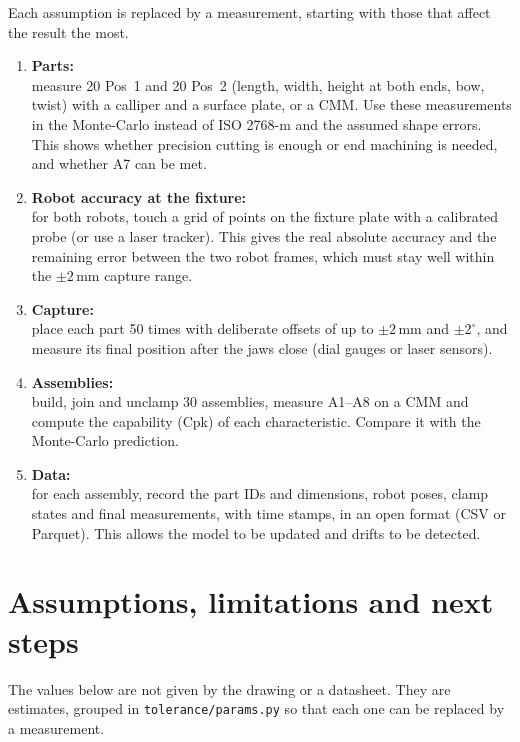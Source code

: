 \documentclass[11pt,a4paper]{article}
\newcommand{\code}[1]{\texttt{#1}}
\begin{document}
Each assumption is replaced by a measurement, starting with those that affect the result the most.
\begin{enumerate}
  \item \textbf{Parts:}\\ measure 20 Pos~1 and 20 Pos~2 (length, width, height at both ends, bow,
        twist) with a calliper and a surface plate, or a CMM. Use these measurements in the
        Monte-Carlo instead of ISO 2768-m and the assumed shape errors. This shows whether precision
        cutting is enough or end machining is needed, and whether A7 can be met.
  \item \textbf{Robot accuracy at the fixture:}\\ for both robots, touch a grid of points on the
        fixture plate with a calibrated probe (or use a laser tracker). This gives the real absolute
        accuracy and the remaining error between the two robot frames, which must stay well within
        the $\pm2$\,mm capture range.
  \item \textbf{Capture:}\\ place each part 50 times with deliberate offsets of up to $\pm2$\,mm and
        $\pm2^\circ$, and measure its final position after the jaws close (dial gauges or laser
        sensors).
  \item \textbf{Assemblies:}\\ build, join and unclamp 30 assemblies, measure A1--A8 on a CMM and
        compute the capability (Cpk) of each characteristic. Compare it with the Monte-Carlo
        prediction.
  \item \textbf{Data:}\\ for each assembly, record the part IDs and dimensions, robot poses, clamp
        states and final measurements, with time stamps, in an open format (CSV or Parquet). This
        allows the model to be updated and drifts to be detected.
\end{enumerate}

\section{Assumptions, limitations and next steps}
\label{sec:assump}

The values below are not given by the drawing or a datasheet. They are estimates, grouped in
\code{tolerance/params.py} so that each one can be replaced by a measurement.
\end{document}
